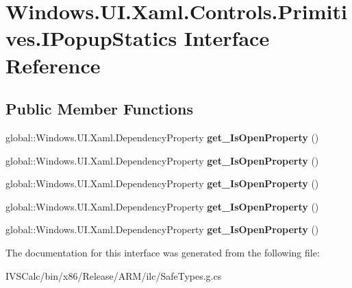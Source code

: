 \hypertarget{interface_windows_1_1_u_i_1_1_xaml_1_1_controls_1_1_primitives_1_1_i_popup_statics}{}\section{Windows.\+U\+I.\+Xaml.\+Controls.\+Primitives.\+I\+Popup\+Statics Interface Reference}
\label{interface_windows_1_1_u_i_1_1_xaml_1_1_controls_1_1_primitives_1_1_i_popup_statics}
\subsection*{Public Member Functions}
\begin{DoxyCompactItemize}
\item 
\mbox{\label{interface_windows_1_1_u_i_1_1_xaml_1_1_controls_1_1_primitives_1_1_i_popup_statics_a71f0d581833df325fb22a9cca1dbdf46}} 
global\+::\+Windows.\+U\+I.\+Xaml.\+Dependency\+Property {\bfseries get\+\_\+\+Is\+Open\+Property} ()
\item 
\mbox{\label{interface_windows_1_1_u_i_1_1_xaml_1_1_controls_1_1_primitives_1_1_i_popup_statics_a71f0d581833df325fb22a9cca1dbdf46}} 
global\+::\+Windows.\+U\+I.\+Xaml.\+Dependency\+Property {\bfseries get\+\_\+\+Is\+Open\+Property} ()
\item 
\mbox{\label{interface_windows_1_1_u_i_1_1_xaml_1_1_controls_1_1_primitives_1_1_i_popup_statics_a71f0d581833df325fb22a9cca1dbdf46}} 
global\+::\+Windows.\+U\+I.\+Xaml.\+Dependency\+Property {\bfseries get\+\_\+\+Is\+Open\+Property} ()
\item 
\mbox{\label{interface_windows_1_1_u_i_1_1_xaml_1_1_controls_1_1_primitives_1_1_i_popup_statics_a71f0d581833df325fb22a9cca1dbdf46}} 
global\+::\+Windows.\+U\+I.\+Xaml.\+Dependency\+Property {\bfseries get\+\_\+\+Is\+Open\+Property} ()
\item 
\mbox{\label{interface_windows_1_1_u_i_1_1_xaml_1_1_controls_1_1_primitives_1_1_i_popup_statics_a71f0d581833df325fb22a9cca1dbdf46}} 
global\+::\+Windows.\+U\+I.\+Xaml.\+Dependency\+Property {\bfseries get\+\_\+\+Is\+Open\+Property} ()
\end{DoxyCompactItemize}


The documentation for this interface was generated from the following file\+:\begin{DoxyCompactItemize}
\item 
I\+V\+S\+Calc/bin/x86/\+Release/\+A\+R\+M/ilc/Safe\+Types.\+g.\+cs\end{DoxyCompactItemize}

